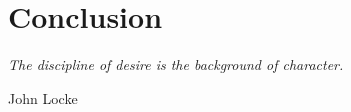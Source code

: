 \chapter{Conclusion}
\label{ch:bkgest}
\epigraph{\emph{The discipline of desire is the background of character.}}{John Locke}
